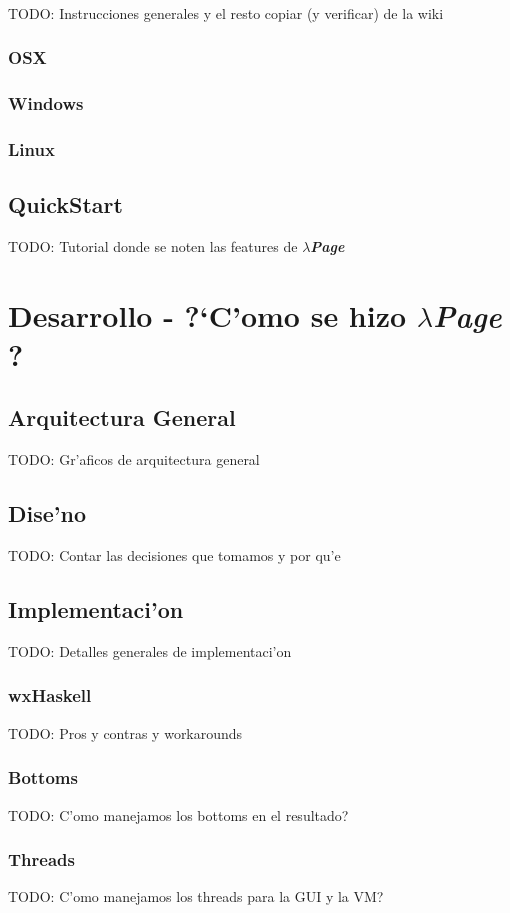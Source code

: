 \documentclass[a4paper]{article}
\newcommand{\hpage}{\textbf{\textsl{$\lambda$Page}} }
\begin{document}
\paragraph{}TODO: Instrucciones generales y el resto copiar (y verificar) de la wiki
\subsubsection{OSX}
\subsubsection{Windows}
\subsubsection{Linux}
\subsection{QuickStart}TODO: Tutorial donde se noten las features de \hpage
\newpage

\section{Desarrollo - ?`C'omo se hizo \hpage?}
\subsection{Arquitectura General} TODO: Gr'aficos de arquitectura general
\subsection{Dise'no} TODO: Contar las decisiones que tomamos y por qu'e
\subsection{Implementaci'on} TODO: Detalles generales de implementaci'on
\subsubsection{wxHaskell}TODO: Pros y contras y workarounds
\subsubsection{Bottoms}TODO: C'omo manejamos los bottoms en el resultado?
\subsubsection{Threads}TODO: C'omo manejamos los threads para la GUI y la VM?
\end{document}
